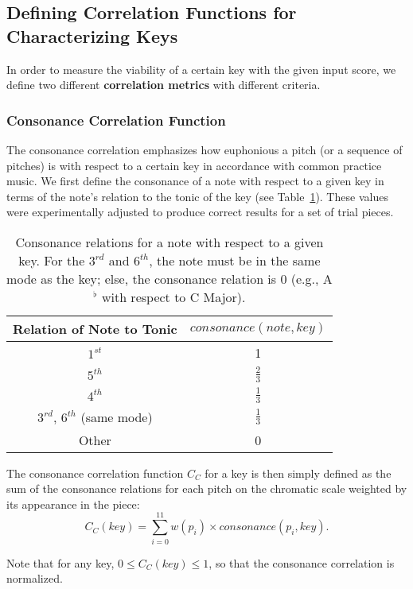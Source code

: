 \documentclass[11pt]{article}
\begin{document}
\subsection{Defining Correlation Functions for Characterizing Keys}
In order to measure the viability of a certain key with the given input score, we define two different {\bf correlation metrics} with different criteria.

\subsubsection{Consonance Correlation Function}
The consonance correlation emphasizes how euphonious a pitch (or a sequence of pitches) is with respect to a certain key in accordance with common practice music. We first define the consonance of a note with respect to a given key in terms of the note's relation to the tonic of the key (see Table~\ref{consonance}). These values were experimentally adjusted to produce correct results for a set of trial pieces.

\begin{table}[h]
\centering
\begin{tabular}{|c|c|}
\hline {\bf Relation of Note to Tonic} & $consonance(note, key)$ \\
\hline $1^{st}$ & 1 \\
\hline $5^{th}$ & $\frac{2}{3}$ \\
\hline $4^{th}$ & $\frac{1}{3}$ \\
\hline $3^{rd}$, $6^{th}$ (same mode) & $\frac{1}{3}$ \\
\hline Other & 0 \\
\hline
\end{tabular}
\caption{Consonance relations for a note with respect to a given key. For the $3^{rd}$ and $6^{th}$, the note must be in the same mode as the key; else, the consonance relation is 0 (e.g., A$^\flat$ with respect to C Major).}
\label{consonance}
\end{table}

The consonance correlation function $C_C$ for a key is then simply defined as the sum of the consonance relations for each pitch on the chromatic scale weighted by its appearance in the piece:
\begin{equation}
	C_C(key) = \sum_{i=0}^{11} w(p_i) \times consonance(p_i, key).
\end{equation}

Note that for any key, $0\leq C_C(key) \leq 1$, so that the consonance correlation is normalized.
\end{document}
